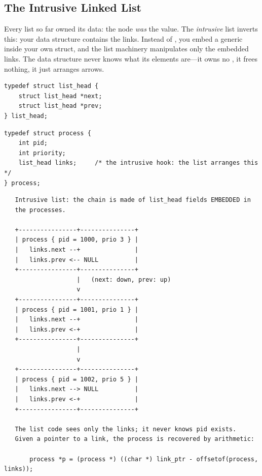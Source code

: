 \subsection{The Intrusive Linked List}

Every list so far owned its data: the node \emph{was} the value. The
\emph{intrusive} list inverts this: your data structure contains the
links. Instead of , you
embed a generic  inside your own struct, and the list
machinery manipulates only the embedded links. The data structure never
knows what its elements are---it owns no , it frees
nothing, it just arranges arrows.

\begin{lstlisting}[caption={The generic link: no data, just arrows.}]
typedef struct list_head {
    struct list_head *next;
    struct list_head *prev;
} list_head;
\end{lstlisting}

\begin{lstlisting}[caption={A struct that carries a link inside it.}]
typedef struct process {
    int pid;
    int priority;
    list_head links;     /* the intrusive hook: the list arranges this */
} process;
\end{lstlisting}

\begin{verbatim}
   Intrusive list: the chain is made of list_head fields EMBEDDED in
   the processes.

   +----------------+---------------+
   | process { pid = 1000, prio 3 } |
   |   links.next --+               |
   |   links.prev <-- NULL          |
   +----------------+---------------+
                    |   (next: down, prev: up)
                    v
   +----------------+---------------+
   | process { pid = 1001, prio 1 } |
   |   links.next --+               |
   |   links.prev <-+               |
   +----------------+---------------+
                    |
                    v
   +----------------+---------------+
   | process { pid = 1002, prio 5 } |
   |   links.next --> NULL          |
   |   links.prev <-+               |
   +----------------+---------------+

   The list code sees only the links; it never knows pid exists.
   Given a pointer to a link, the process is recovered by arithmetic:

       process *p = (process *) ((char *) link_ptr - offsetof(process, links));
\end{verbatim}

